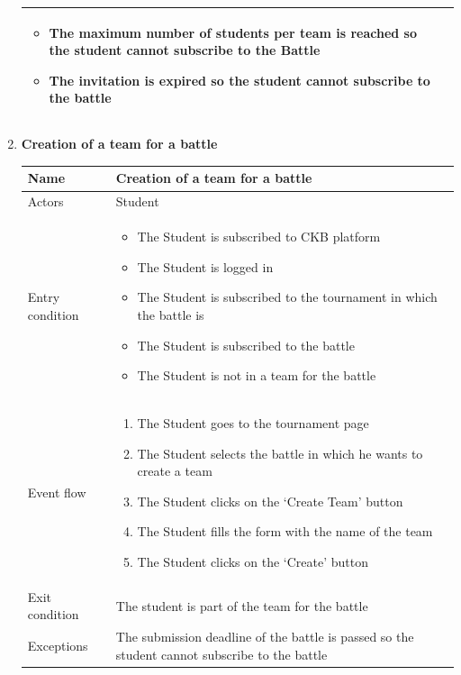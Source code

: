 \begin{enumerate}[label=UC\arabic*:]
\begin{tabular}{|p{3cm}|p{8cm}|}
\begin{itemize}
            \item The maximum number of students per team is reached so the student cannot subscribe to the Battle
            \item The invitation is expired so the student cannot subscribe to the battle
        \end{itemize} \\
        \hline
    \end{tabular}
    \item \textbf{Creation of a team for a battle} \\
    \begin{tabular}{|p{3cm}|p{8cm}|}
        \hline
        Name & Creation of a team for a battle \\
        \hline
        Actors & Student \\
        \hline
        Entry condition &
        \begin{itemize}
            \item The Student is subscribed to CKB platform
            \item The Student is logged in
            \item The Student is subscribed to the tournament in which the battle is
            \item The Student is subscribed to the battle
            \item The Student is not in a team for the battle
        \end{itemize} \\
        \hline
        Event flow &
        \begin{enumerate}[label=\arabic*.]
            \item The Student goes to the tournament page
            \item The Student selects the battle in which he wants to create a team
            \item The Student clicks on the `Create Team' button
            \item The Student fills the form with the name of the team
            \item The Student clicks on the `Create' button
        \end{enumerate} \\
        \hline
        Exit condition & The student is part of the team for the battle \\
        \hline
        Exceptions & The submission deadline of the battle is passed so the student cannot subscribe to the battle \\

\end{tabular}
\end{enumerate}
